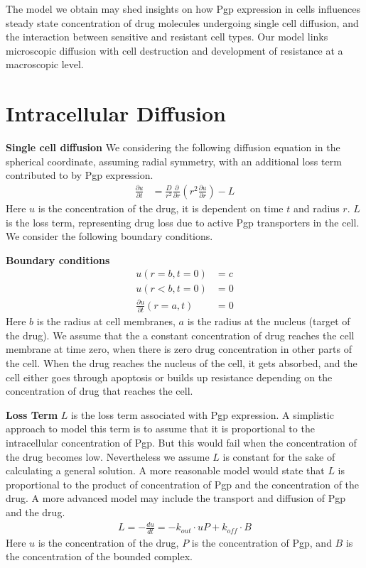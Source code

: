 \documentclass{edm_article}
\begin{document}
The model we obtain may shed insights on how Pgp expression in cells influences steady state concentration of drug molecules undergoing single cell diffusion, and the interaction between sensitive and resistant cell types. Our model links microscopic diffusion with cell destruction and development of resistance at a macroscopic level. 

\section{Intracellular Diffusion}
\textbf{Single cell diffusion} We considering the following diffusion equation in the spherical coordinate, assuming radial symmetry, with an additional loss term contributed to by Pgp expression.
\begin{align*}
    \frac{\partial u}{\partial t} &= \frac{D}{r^2}\frac{\partial}{\partial r}(r^2\frac{\partial u}{\partial r}) - L
\end{align*}
Here $u$ is the concentration of the drug, it is dependent on time $t$ and radius $r$. $L$ is the loss term, representing drug loss due to active Pgp transporters in the cell. We consider the following boundary conditions.

\textbf{Boundary conditions}
\begin{align*}
    u(r = b, t = 0) &= c\\
    u(r < b, t = 0) &= 0\\
    \frac{\partial u}{\partial t}(r = a, t) &= 0
\end{align*}
Here $b$ is the radius at cell membranes, $a$ is the radius at the nucleus (target of the drug). We assume that the a constant concentration of drug reaches the cell membrane at time zero, when there is zero drug concentration in other parts of the cell. When the drug reaches the nucleus of the cell, it gets absorbed, and the cell either goes through apoptosis or builds up resistance depending on the concentration of drug that reaches the cell.

\textbf{Loss Term} $L$ is the loss term associated with Pgp expression. A simplistic approach to model this term is to assume that it is proportional to the intracellular concentration of Pgp. But this would fail when the concentration of the drug becomes low. Nevertheless we assume $L$ is constant for the sake of calculating a general solution. A more reasonable model would state that $L$ is proportional to the product of concentration of Pgp and the concentration of the drug. A more advanced model may include the transport and diffusion of Pgp and the drug.
\begin{align*}
    L = -\frac{du}{dt} = -k_{out}\cdot uP + k_{off}\cdot B
\end{align*}
Here $u$ is the concentration of the drug, $P$ is the concentration of Pgp, and $B$ is the concentration of the bounded complex.
\end{document}
